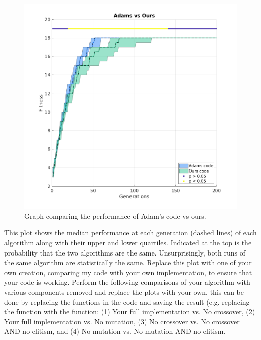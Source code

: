 \documentclass{article}
\begin{document}
	\begin{figure}[http]
	\begin{center}
	\includegraphics[scale=0.3]{img/Full_vsStandard.png}
	\caption{Graph comparing the performance of Adam's code vs ours.}
	\end{center}
	\end{figure}
	
	This plot shows the median performance at each generation (dashed lines) of each algorithm along with their upper and lower quartiles. Indicated at the top is the probability that the two algorithms are the same. Unsurprisingly, both runs of the same algorithm are statistically the same. Replace this plot with one of your own creation, comparing my code with your own implementation, to ensure that your code is working.
\newpage
	Perform the following comparisons of your algorithm with various components removed and replace the plots with your own, this can be done by replacing the functions in the code and saving the result (e.g. replacing the  function with the  function: (1) Your full implementation vs. No crossover, (2) Your full implementation vs. No mutation, (3) No crossover vs. No crossover AND no elitism, and (4) No mutation  vs. No mutation AND no elitism.
\end{document}
